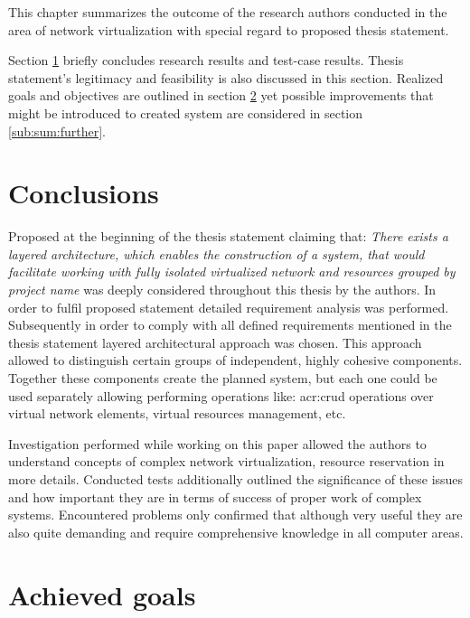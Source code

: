 \documentclass[11pt]{book}
\begin{document}
	  This chapter summarizes the outcome of the research authors conducted in the area of network virtualization with special regard to 
	  proposed thesis statement.
	
	  Section \ref{sub:sum:concl} briefly concludes research results and test-case results. Thesis statement's legitimacy and feasibility 
		is also discussed in this section. Realized goals and objectives are outlined in section \ref{sub:sum:achieved} yet
	  possible improvements that might be introduced to created system are considered in section \ref{sub:sum:further}.

    \section{Conclusions}
		\label{sub:sum:concl}
		
		Proposed at the beginning of the thesis statement claiming that: 
		\emph{There exists a layered architecture, which enables the construction of a system, that would facilitate working with 
		fully  isolated virtualized network and resources grouped by project name} was deeply considered throughout this thesis by 
		the authors. 
		In order to fulfil proposed statement detailed requirement analysis was performed. Subsequently in order to comply
    with
		all defined requirements mentioned in the thesis statement layered architectural approach was chosen. This approach allowed 
		to distinguish certain groups of independent, highly cohesive components. Together these components create the planned
		system, but each one could be used separately allowing performing operations like: \gls{acr:crud} operations over virtual network elements, 
		virtual resources management, etc. 
		
		Investigation performed while working on this paper allowed the authors to understand concepts of complex network virtualization,
		resource reservation in more details. Conducted tests additionally outlined the significance of these issues and how important they
		are in terms of success of proper work of complex systems. Encountered problems only confirmed that although very useful 
		they are also quite demanding and require comprehensive knowledge in all computer areas. 
		
    \section{Achieved goals}
		\label{sub:sum:achieved}

		
\end{document}

